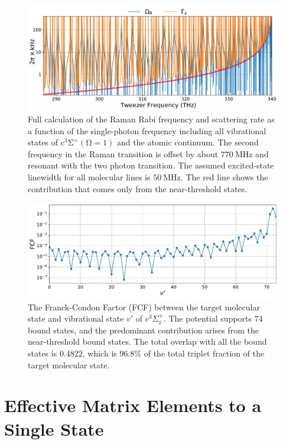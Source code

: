 \documentclass[aps,prx,secnumarabic,amsmath,amssymb,10pt,superscriptaddress]{revtex4-2}
\begin{document}
\begin{figure}[ht!]
  \includegraphics[width=\textwidth]{imgs/raman_theory_full.pdf}
  \caption{Full calculation of the Raman Rabi frequency and scattering rate
    as a function of the single-photon frequency
    including all vibrational states of $ \mathrm{c^3\Sigma^+(\Omega = 1)}$
    and the atomic continuum.
    The second frequency in the Raman transition is offset by about $770~\mathrm{MHz}$
    and resonant with the two photon transition.
    The assumed excited-state linewidth for all molecular lines is $50~\text{MHz}$.
    The red line shows the contribution that comes only from the near-threshold states.
    \label{f-sm}}
\end{figure}

\begin{figure}[ht!]
  \includegraphics[width=\textwidth]{imgs/fcf_c3sigma.pdf}
  \caption{The Franck-Condon Factor (FCF) between the target molecular state and vibrational state $v'$ of $c^3\Sigma^+_1$. The potential supports 74 bound states, and the predominant contribution arises from the near-threshold bound states. The total overlap with all the bound states is $0.4822$, which is $96.8\%$ of the total triplet fraction of the target molecular state.
    \label{f-smfcf}}
\end{figure}
\section{Effective Matrix Elements to a Single State}
\end{document}
